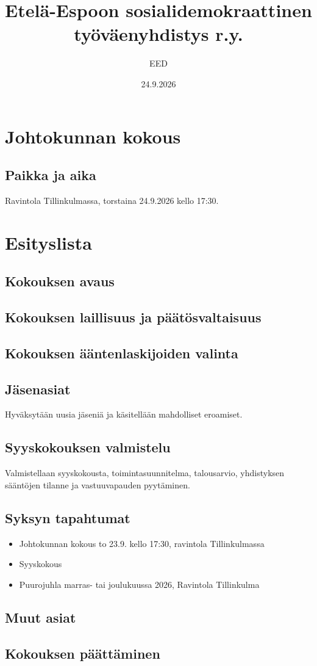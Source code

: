 \documentclass[a4paper,12pt]{article}
\title{Etelä-Espoon sosialidemokraattinen työväenyhdistys r.y.}
\author{EED}
\date{24.9.2026}
\begin{document}
\maketitle
\tableofcontents
\section*{Johtokunnan kokous}
\subsection*{Paikka ja aika}
Ravintola Tillinkulmassa, torstaina 24.9.2026 kello 17:30.
\section*{Esityslista}
\subsection{Kokouksen avaus}
\subsection{Kokouksen laillisuus ja päätösvaltaisuus}
\subsection{Kokouksen ääntenlaskijoiden valinta}
\subsection{Jäsenasiat}
Hyväksytään uusia jäseniä ja käsitellään mahdolliset eroamiset.
\subsection{Syyskokouksen valmistelu}
Valmistellaan syyskokousta, toimintasuunnitelma, talousarvio, yhdistyksen sääntöjen tilanne ja vastuuvapauden pyytäminen.
\subsection{Syksyn tapahtumat}
\begin{itemize}
\item{Johtokunnan kokous} to 23.9. kello 17:30, ravintola Tillinkulmassa
\item{Syyskokous}
\item{Puurojuhla} marras- tai joulukuussa 2026, Ravintola Tillinkulma
\end{itemize}
\subsection{Muut asiat}
\subsection{Kokouksen päättäminen}
\end{document}

